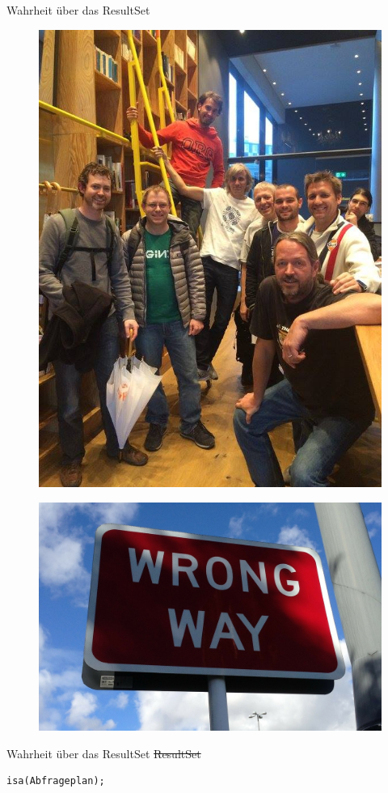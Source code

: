 \begin{frame}{Wahrheit über das ResultSet}
\begin{figure}[!ht]
\centering
\includegraphics[width=0.5\linewidth]{img/pdc_users.jpg}
\end{figure}
\end{frame}


\begin{frame}{}
\begin{figure}[!ht]
\centering
\includegraphics[width=1\linewidth]{img/wrong-way.jpg}
\end{figure}
\end{frame}

\begin{frame}[fragile]{Wahrheit über das ResultSet}
\sout{ResultSet}

\begin{lstlisting}
isa(Abfrageplan);
\end{lstlisting}

\end{frame}

